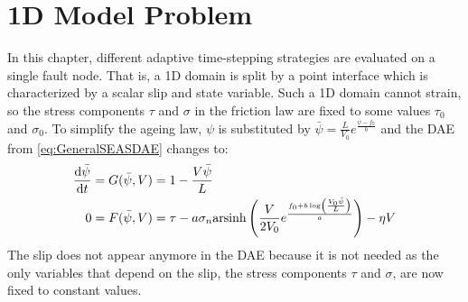 \chapter{1D Model Problem}
\label{chap:FirstExperiments}
In this chapter, different adaptive time-stepping strategies are evaluated on a single fault node. That is, a 1D domain is split by a point interface which is characterized by a scalar slip and state variable. Such a 1D domain cannot strain, so the stress components $\tau$ and $\sigma$ in the friction law are fixed to some values $\tau_0$ and $\sigma_0$. To simplify the ageing law, $\psi$ is substituted by $\bar{\psi} = \frac{L}{V_0}e^{\frac{\psi-f_0}{b}}$ and the DAE from \autoref{eq:GeneralSEASDAE} changes to: 
\begin{align}
    \label{eq:first_DAE_ODE}
    \dv{\bar{\psi}}{t} &= G(\bar{\psi},V) = 1 - \frac{V\bar{\psi}}{L} \\
    \label{eq:first_DAE_algeb}
    0 &= F(\bar{\psi},V) = \tau - a\sigma_n\text{arsinh}\left(\frac{V}{2V_0}e^{\frac{f_0 + b\log\left(\frac{V_0\bar{\psi}}{L}\right)}{a}}\right)-\eta V
\end{align}
The slip does not appear anymore in the DAE because it is not needed as the only variables that depend on the slip, the stress components $\tau$ and $\sigma$, are now fixed to constant values. 

